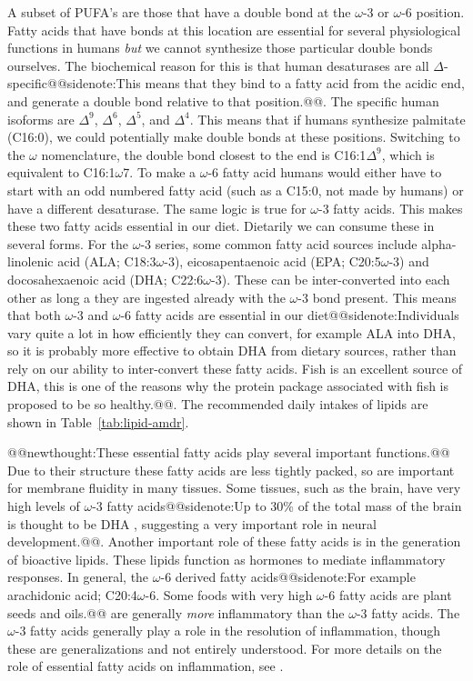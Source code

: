 \documentclass{tufte-handout}
\makeatletter
\def\newthought#1{@@newthought:#1@@}
\def\sidenote#1{@@sidenote:#1@@}
\makeatother
\begin{document}
A subset of PUFA's are those that have a double bond at the $\omega$-3 or $\omega$-6 position.  Fatty acids that have bonds at this location are essential for several physiological functions in humans \emph{but} we cannot synthesize those particular double bonds ourselves.  The biochemical reason for this is that human desaturases are all $\Delta$-specific\sidenote{This means that they bind to a fatty acid from the acidic end, and generate a double bond relative to that position.}.  The specific human isoforms are $\Delta^9$, $\Delta^6$, $\Delta^5$, and $\Delta^4$.  This means that if humans synthesize palmitate (C16:0), we could potentially make double bonds at these positions.  Switching to the $\omega$ nomenclature, the double bond closest to the end is C16:1$\Delta^9$, which is equivalent to C16:1$\omega$7.  To make a $\omega$-6 fatty acid humans would either have to start with an odd numbered fatty acid (such as a C15:0, not made by humans) or have a different desaturase.  The same logic is true for $\omega$-3 fatty acids.  This makes these two fatty acids essential in our diet.  Dietarily we can consume these in several forms.  For the $\omega$-3 series, some common fatty acid sources include alpha-linolenic acid (ALA; C18:3$\omega$-3), eicosapentaenoic acid (EPA; C20:5$\omega$-3) and docosahexaenoic acid (DHA; C22:6$\omega$-3).  These can be inter-converted into each other as long a they are ingested already with the $\omega$-3 bond present.  This means that both $\omega$-3  and $\omega$-6 fatty acids are essential in our diet\sidenote{Individuals vary quite a lot in how efficiently they can convert, for example ALA into DHA, so it is probably more effective to obtain DHA from dietary sources, rather than rely on our ability to inter-convert these fatty acids.  Fish is an excellent source of DHA, this is one of the reasons why the protein package associated with fish is proposed to be so healthy.}.  The recommended daily intakes of lipids are shown in Table~\ref{tab:lipid-amdr}.

\newthought{These essential fatty acids\index{Lipids!Essential Fatty Acids} play several important functions.}  Due to their structure these fatty acids are less tightly packed, so are important for membrane fluidity in many tissues.  Some tissues, such as the brain, have very high levels of $\omega$-3 fatty acids\sidenote{Up to 30\% of the total mass of the brain is thought to be DHA \citep{Crawford1976}, suggesting a very important role in neural development.}.  Another important role of these fatty acids is in the generation of bioactive lipids.  These lipids function as hormones to mediate inflammatory responses.  In general, the $\omega$-6 derived fatty acids\sidenote{For example arachidonic acid; C20:4$\omega$-6.  Some foods with very high $\omega$-6 fatty acids are plant seeds and oils.} are generally \emph{more} inflammatory than the $\omega$-3 fatty acids.  The $\omega$-3 fatty acids generally play a role in the resolution of inflammation, though these are generalizations and not entirely understood.  For more details on the role of essential fatty acids on inflammation, see \citet{Calder2013}.  
\end{document}
